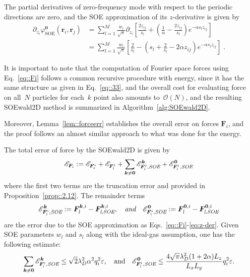 The partial derivatives of zero-frequency mode with respect to the periodic directions are zero, and the SOE approximation of its $z$-derivative is given by
\begin{equation}\label{eq:dzphi_0}
	\begin{split}
		\partial_{z_{i}} \varphi^{\bm{0}}_{\text{SOE}}(\bm{r}_{i},\bm{r}_{j}) 
		& = \sum_{l=1}^{M} \frac{w_l}{\sqrt{\pi}} \partial_{z_{i}} \left[\frac{2z_{ij}}{s_l}+\left(\frac{1}{\alpha} - \frac{2z_{ij}}{s_l}\right)e^{-\alpha s_l z_{ij}}\right] \\
		& = \sum_{l=1}^{M} \frac{w_l}{\sqrt{\pi}} \left[ \frac{2}{s_l} - \left( s_l + \frac{2}{s_l} - 2 \alpha z_{ij} \right) e^{-\alpha s_l z_{ij}} \right]\;.
	\end{split}
\end{equation}

It is important to note that the computation of Fourier space forces using Eq.~\eqref{eq::Fi} follows a common recursive procedure with energy, since it has the same structure as given in Eq.~\eqref{eq::33}, and the overall cost for evaluating force on all~$N$ particles for each~$k$ point also amounts to~$\mathcal{O}(N)$, and the resulting SOEwald2D method is summarized in Algorithm~\ref{alg:SOEwald2D}.

Moreover, Lemma~\ref{lem::forceerr} establishes the overall error on forces $\bm{F}_{i}$, and the proof follows an almost similar approach to what was done for the energy. %

\begin{lem}\label{lem::forceerr}
	The total error of force by the SOEwald2D is given by
	\begin{equation}
		\mathscr{E}_{\bm{F}_{i}} := \mathscr{E}_{\bm{F}_{\emph{s}}^{i}} + \mathscr{E}_{\bm{F}_{\emph{l}}^{i}} + \sum_{\bm{k}\neq \bm{0}} \mathscr{E}_{\bm{F}_{\emph{l}}^i, \emph{SOE}}^{\bm{k}} + \mathscr{E}_{\bm{F}_{\emph{l}}^{i},\emph{SOE}}^{\bm{0}}
	\end{equation}
	where the first two terms are the truncation error and provided in Proposition~\ref{prop::2.12}. The remainder terms 
	\begin{equation}
		\mathscr{E}_{\bm{F}_{\emph{l}}^i,\emph{SOE}}^{\bm{k}} := \bm{F}_{\emph{l}}^{\bm{k}, i} - \bm{F}_{\emph{l},\emph{SOE}}^{\bm{k}, i}, \quad\emph{and} \quad \mathscr{E}_{\bm{F}_{\emph{l}}^{i}, \emph{SOE}}^{\bm{0}} := \bm{F}_{\emph{l}}^{\bm{0}, i}-\bm{F}_{\emph{l}, \emph{SOE}}^{\bm{0}, i}
	\end{equation}
	are the error due to the SOE approximation as Eqs.~\eqref{eq::Fi}-\eqref{eq:z-der}. Given SOE parameters $w_l$ and $s_l$ along with the ideal-gas assumption, one has the following estimate:
	\begin{equation}
		\sum_{\bm{k}\neq\bm{0}} \mathscr{E}_{\bm{F}_{\emph{l}}^i, \emph{SOE}}^{ \bm{k}}\leq \sqrt{2}\lambda_D^2\alpha^2q_{i}^2\varepsilon,\quad\text{and}\quad \mathscr{E}_{\bm{F}_{\emph{l}}^{i},\emph{SOE}}^{\bm{0}}\leq \frac{4\sqrt{\pi}\lambda_D^2 (1+2\alpha)L_z}{L_xL_y}q_{i}^2\varepsilon.
	\end{equation}
\end{lem}

